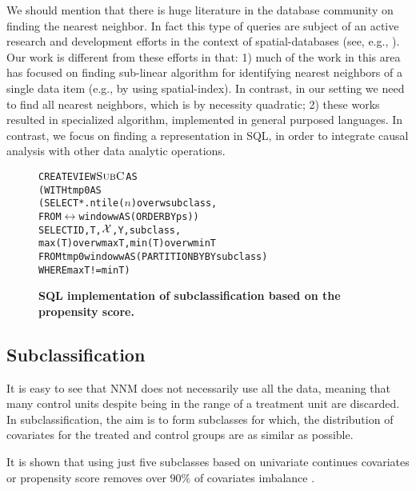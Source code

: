 We should mention that there is huge literature in the database
community on finding the nearest neighbor. In fact this type of
queries are subject of an active research and development efforts in
the context of spatial-databases (see, e.g.,
\cite{obe2015postgis}). Our work is different from these efforts in that: 1) much of the work in this area has focused on finding sub-linear algorithm for identifying nearest neighbors of a single data item (e.g., by using spatial-index). In contrast, in our setting
we need to find all nearest neighbors, which is by necessity quadratic; 2) these works resulted in specialized algorithm,
implemented in general purposed languages. In contrast, we focus on finding a representation in SQL, in order to integrate causal
 analysis with other data analytic operations.  









\begin{figure}
\begin{alltt} \scriptsize
CREATE VIEW \(\sbc\) AS
(WITH tmp0 AS
  (SELECT *. ntile(\(n\)) over w subclass,
   FROM \(\rel\) window w AS (ORDER BY ps))
SELECT ID, T, \(\ccv\), Y, subclass,
             max(T) over w maxT, min(T) over w minT
FROM tmp0  window w AS (PARTITION BY BY subclass)
WHERE maxT!=minT)
\end{alltt}
\vspace{-0.3cm}
  \caption{\bf{SQL implementation of subclassification based on the
      propensity score.}}\label{fig:subpr}
\end{figure}

\vspace{-.2cm}

\subsection{Subclassification}
\label{sec:sub}
It is easy to see that NNM does not necessarily use all the data,
meaning that many control units despite being in the range of a
treatment unit are discarded.  In subclassification, the aim is to
form subclasses for which, the distribution of covariates for the
treated and control groups are as similar as possible.  It is shown that using just five subclasses based
on univariate continues covariates or propensity score removes over
$90\%$ of covariates imbalance \cite{cochran1968effectiveness,
  rosenbaum1984reducing}.

